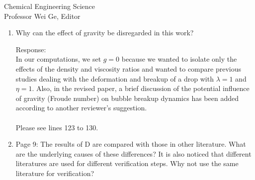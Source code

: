 \documentclass{letter}
\begin{document}
\begin{letter}{
Chemical Engineering Science\\
Professor Wei Ge, Editor\\}
\begin{enumerate}
Response: \\
As explained in the ``Numerical Analysis", the CLSVOF method couples both the level set and VOF methods and can 
take advantage of both methodologies. 
Consequently,  the CLSVOF method is superior to other interface-capturing/interface-tracking methods. 
This is the reason we selected the CLSVOF method. We only referred to several interface-capturing/interface-tracking 
method methods in introducing previous studies.\\
\\

\par\noindent
\item
\textsf
{Why can the effect of gravity be disregarded in this work?\\}
\vspace{3 mm}

Response: \\
In our computations, we set $g = 0$ because we wanted to isolate only the effects of the density and viscosity ratios and 
wanted to compare previous studies dealing with the deformation and breakup of a drop with $\lambda =1$ and $\eta = 1$. 
Also, in the revised paper, a brief discussion of the potential influence of gravity (Froude number) on bubble breakup dynamics 
has been added according to another reviewer's suggestion.\\
\\
Please see lines 123 to 130.
\\

\par\noindent
\item
\textsf
{Page 9: The results of D are compared with those in other literature. 
What are the underlying causes of these differences? It is also noticed that different literatures are used for different verification steps.
Why not use the same literature for verification?}
\vspace{3 mm}


\end{enumerate}
\end{letter}
\end{document}

